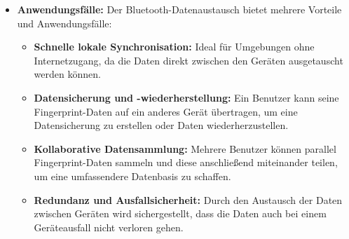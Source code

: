 \begin{itemize}
    \item \textbf{Anwendungsfälle:} Der Bluetooth-Datenaustausch bietet mehrere Vorteile und Anwendungsfälle:
        \begin{itemize}
            \item \textbf{Schnelle lokale Synchronisation:} Ideal für Umgebungen ohne Internetzugang, da die Daten direkt zwischen den Geräten ausgetauscht werden können.
            \item \textbf{Datensicherung und -wiederherstellung:} Ein Benutzer kann seine Fingerprint-Daten auf ein anderes Gerät übertragen, um eine Datensicherung zu erstellen oder Daten wiederherzustellen.
            \item \textbf{Kollaborative Datensammlung:} Mehrere Benutzer können parallel Fingerprint-Daten sammeln und diese anschließend miteinander teilen, um eine umfassendere Datenbasis zu schaffen.
            \item \textbf{Redundanz und Ausfallsicherheit:} Durch den Austausch der Daten zwischen Geräten wird sichergestellt, dass die Daten auch bei einem Geräteausfall nicht verloren gehen.
        \end{itemize}
\end{itemize}

